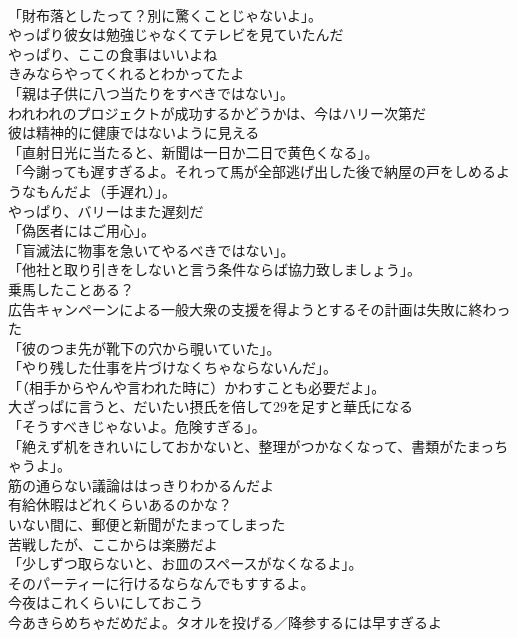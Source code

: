 \documentclass[8pt]{extreport}
\begin{document}
\begin{CJK}{UTF8}{min}
\\	「財布落としたって？別に驚くことじゃないよ」。	
\\	やっぱり彼女は勉強じゃなくてテレビを見ていたんだ	
\\	やっぱり、ここの食事はいいよね	
\\	きみならやってくれるとわかってたよ	
\\	「親は子供に八つ当たりをすべきではない」。	
\\	われわれのプロジェクトが成功するかどうかは、今はハリー次第だ	
\\	彼は精神的に健康ではないように見える	
\\	「直射日光に当たると、新聞は一日か二日で黄色くなる」。	
\\	「今謝っても遅すぎるよ。それって馬が全部逃げ出した後で納屋の戸をしめるようなもんだよ（手遅れ）」。	
\\	やっぱり、バリーはまた遅刻だ	
\\	「偽医者にはご用心」。	
\\	「盲滅法に物事を急いてやるべきではない」。	
\\	「他社と取り引きをしないと言う条件ならば協力致しましょう」。	
\\	乗馬したことある？	
\\	広告キャンペーンによる一般大衆の支援を得ようとするその計画は失敗に終わった	
\\	「彼のつま先が靴下の穴から覗いていた」。	
\\	「やり残した仕事を片づけなくちゃならないんだ」。	
\\	「（相手からやんや言われた時に）かわすことも必要だよ」。	
\\	大ざっぱに言うと、だいたい摂氏を倍して29を足すと華氏になる	
\\	「そうすべきじゃないよ。危険すぎる」。	
\\	「絶えず机をきれいにしておかないと、整理がつかなくなって、書類がたまっちゃうよ」。	
\\	筋の通らない議論ははっきりわかるんだよ	
\\	有給休暇はどれくらいあるのかな？	
\\	いない間に、郵便と新聞がたまってしまった	
\\	苦戦したが、ここからは楽勝だよ	
\\	「少しずつ取らないと、お皿のスペースがなくなるよ」。	
\\	そのパーティーに行けるならなんでもすするよ。	
\\	今夜はこれくらいにしておこう	
\\	今あきらめちゃだめだよ。タオルを投げる／降参するには早すぎるよ	

\end{CJK}
\end{document}
